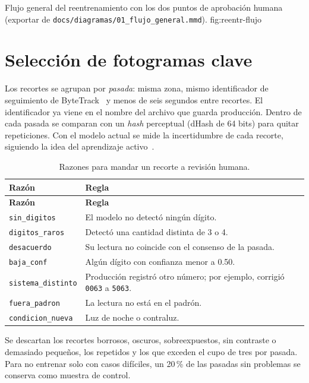   {Flujo general del reentrenamiento con los dos puntos de aprobación
   humana (exportar de \texttt{docs/diagramas/01\_flujo\_general.mmd}).}
  {fig:reentr-flujo}

\section{Selección de fotogramas clave}

Los recortes se agrupan por \emph{pasada}: misma zona, mismo
identificador de seguimiento de ByteTrack~\cite{zhang2022bytetrack} y
menos de seis segundos entre recortes. El identificador ya viene en el
nombre del archivo que guarda producción. Dentro de cada pasada se
comparan con un \emph{hash} perceptual (dHash de 64 bits) para quitar
repeticiones. Con el modelo actual se mide la incertidumbre de cada
recorte, siguiendo la idea del aprendizaje activo~\cite{settles2009}.

\begin{longtable}{@{}L{3.6cm}L{10.4cm}@{}}
  \caption{Razones para mandar un recorte a revisión humana.}
  \label{tab:reentr-razones} \\
  \toprule
  \textbf{Razón} & \textbf{Regla} \\
  \midrule
  \endfirsthead
  \toprule
  \textbf{Razón} & \textbf{Regla} \\
  \midrule
  \endhead
  \texttt{sin\_digitos} & El modelo no detectó ningún dígito. \\
  \texttt{digitos\_raros} & Detectó una cantidad distinta de 3 o 4. \\
  \texttt{desacuerdo} & Su lectura no coincide con el consenso de la pasada. \\
  \texttt{baja\_conf} & Algún dígito con confianza menor a 0.50. \\
  \texttt{sistema\_distinto} & Producción registró otro número; por ejemplo,
    corrigió \texttt{0063} a \texttt{5063}. \\
  \texttt{fuera\_padron} & La lectura no está en el padrón. \\
  \texttt{condicion\_nueva} & Luz de noche o contraluz. \\
  \bottomrule
\end{longtable}

Se descartan los recortes borrosos, oscuros, sobreexpuestos, sin
contraste o demasiado pequeños, los repetidos y los que exceden el cupo
de tres por pasada. Para no entrenar solo con casos difíciles, un 20\,\%
de las pasadas sin problemas se conserva como muestra de control.

